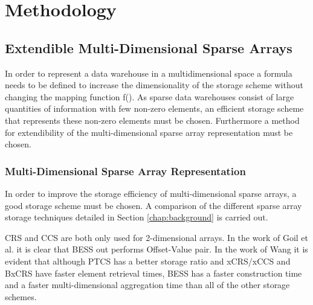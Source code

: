 %
%
%
%   
%
%
\chapter{Methodology} \label{chap:methodology}
\vspace{-1cm}

\section{Extendible Multi-Dimensional Sparse Arrays}

In order to represent a data warehouse in a multidimensional space a formula needs to be defined to increase the dimensionality of the storage scheme without changing the mapping function f(). As sparse data warehouses consist of large quantities of information with few non-zero elements, an efficient storage scheme that represents these non-zero elements must be chosen. Furthermore a method for extendibility of the multi-dimensional sparse array representation must be chosen.

\subsection{Multi-Dimensional Sparse Array Representation}
In order to improve the storage efficiency of multi-dimensional sparse arrays, a good storage scheme must be chosen. A comparison of the different sparse array storage techniques detailed in Section \ref{chap:background} is carried out.

CRS and CCS are both only used for 2-dimensional arrays. In the work of Goil et al. \cite{goil:bess} it is clear that BESS out performs Offset-Value pair. In the work of Wang \cite{wang:2014sar} it is evident that although PTCS has a better storage ratio and xCRS/xCCS and BxCRS have faster element retrieval times, BESS has a faster construction time and a faster multi-dimensional aggregation time than all of the other storage schemes. 

